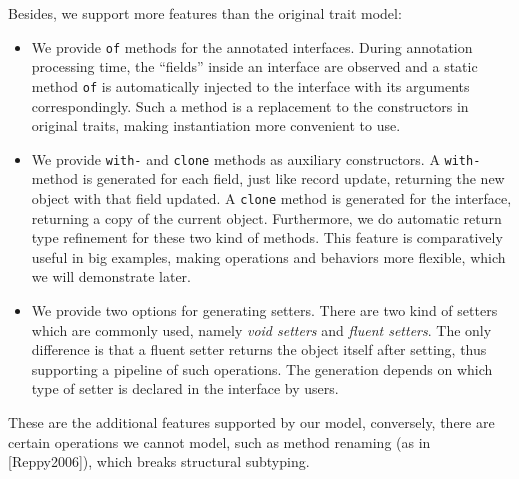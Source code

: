 Besides, we support more features than the original trait model:
\begin{itemize}
\item We provide \texttt{of} methods for the annotated interfaces. During annotation processing time, the ``fields'' inside an interface are observed and a static method \texttt{of} is automatically injected to the interface with its arguments correspondingly. Such a method is a replacement to the constructors in original traits, making instantiation more convenient to use.
\item We provide \texttt{with-} and \texttt{clone} methods as auxiliary constructors. A \texttt{with-} method is generated for each field, just like record update, returning the new object with that field updated. A \texttt{clone} method is generated for the interface, returning a copy of the current object. Furthermore, we do automatic return type refinement for these two kind of methods. This feature is comparatively useful in big examples, making operations and behaviors more flexible, which we will demonstrate later.
\item We provide two options for generating setters. There are two kind of setters which are commonly used, namely \textit{void setters} and \textit{fluent setters}. The only difference is that a fluent setter returns the object itself after setting, thus supporting a pipeline of such operations. The generation depends on which type of setter is declared in the interface by users.
\end{itemize}

These are the additional features supported by our model, conversely, there are certain operations we cannot model, such as method renaming (as in [Reppy2006]), which breaks structural subtyping.

